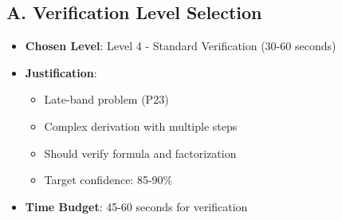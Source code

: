 \documentclass[12pt]{article}
\begin{document}
\begin{verificationbox}
\subsection*{A. Verification Level Selection}
\begin{itemize}[leftmargin=*]
    \item \textbf{Chosen Level}: Level 4 - Standard Verification (30-60 seconds)
    \item \textbf{Justification}: 
    \begin{itemize}
        \item Late-band problem (P23)
        \item Complex derivation with multiple steps
        \item Should verify formula and factorization
        \item Target confidence: 85-90\%
    \end{itemize}
    \item \textbf{Time Budget}: 45-60 seconds for verification
\end{itemize}


\end{verificationbox}
\end{document}
